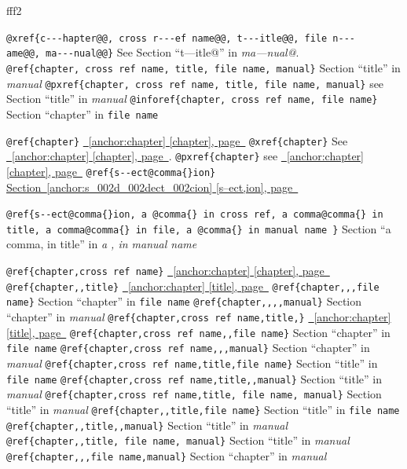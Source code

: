 \documentclass{book}
\newenvironment{Texinfoindented}{\begin{list}{}{}\item\relax}{\end{list}}
\renewcommand{\_}{\Texinfounderscore\discretionary{}{}{}}
\begin{document}
\begin{titlepage}
%
\begin{Texinfoindented}
\unskip{\parskip=0pt\noindent}%
fff2
\end{Texinfoindented}


\texttt{@xref\{c{-}{-}{-}hapter@@,\ cross r{-}{-}{-}ef name@@,\ t{-}{-}{-}itle@@,\ file n{-}{-}{-}ame@@,\ ma{-}{-}{-}nual@@\}} See Section ``t---itle@'' in \textsl{ma---nual@}.
\texttt{@ref\{chapter,\ cross ref name,\ title,\ file name,\ manual\}} Section ``title'' in \textsl{manual}
\texttt{@pxref\{chapter,\ cross ref name,\ title,\ file name,\ manual\}} see Section ``title'' in \textsl{manual}
\texttt{@inforef\{chapter,\ cross ref name,\ file name\}} Section ``chapter'' in \texttt{file name}

\texttt{@ref\{chapter\}} \hyperref[anchor:chapter]{\chaptername~\ref*{anchor:chapter} [chapter], page~\pageref*{anchor:chapter}}
\texttt{@xref\{chapter\}} See \hyperref[anchor:chapter]{\chaptername~\ref*{anchor:chapter} [chapter], page~\pageref*{anchor:chapter}}.
\texttt{@pxref\{chapter\}} see \hyperref[anchor:chapter]{\chaptername~\ref*{anchor:chapter} [chapter], page~\pageref*{anchor:chapter}}
\texttt{@ref\{s{-}{-}ect@comma\{\}ion\}} \hyperref[anchor:s_002d_002dect_002cion]{Section~\ref*{anchor:s_002d_002dect_002cion} [s--ect,ion], page~\pageref*{anchor:s_002d_002dect_002cion}}

\texttt{@ref\{s{-}{-}ect@comma\{\}ion,\ a @comma\{\}\ in cross
ref,\ a comma@comma\{\}\ in title,\ a comma@comma\{\}\ in file,\ a @comma\{\}\ in manual name \}}
Section ``a comma, in title'' in \textsl{a , in manual name}

\texttt{@ref\{chapter,cross ref name\}} \hyperref[anchor:chapter]{\chaptername~\ref*{anchor:chapter} [chapter], page~\pageref*{anchor:chapter}}
\texttt{@ref\{chapter{,}{,}title\}} \hyperref[anchor:chapter]{\chaptername~\ref*{anchor:chapter} [title], page~\pageref*{anchor:chapter}}
\texttt{@ref\{chapter{,}{,},file name\}} Section ``chapter'' in \texttt{file name}
\texttt{@ref\{chapter{,}{,}{,}{,}manual\}} Section ``chapter'' in \textsl{manual}
\texttt{@ref\{chapter,cross ref name,title,\}} \hyperref[anchor:chapter]{\chaptername~\ref*{anchor:chapter} [title], page~\pageref*{anchor:chapter}}
\texttt{@ref\{chapter,cross ref name{,}{,}file name\}} Section ``chapter'' in \texttt{file name}
\texttt{@ref\{chapter,cross ref name{,}{,},manual\}} Section ``chapter'' in \textsl{manual}
\texttt{@ref\{chapter,cross ref name,title,file name\}} Section ``title'' in \texttt{file name}
\texttt{@ref\{chapter,cross ref name,title{,}{,}manual\}} Section ``title'' in \textsl{manual}
\texttt{@ref\{chapter,cross ref name,title,\ file name,\ manual\}} Section ``title'' in \textsl{manual}
\texttt{@ref\{chapter{,}{,}title,file name\}} Section ``title'' in \texttt{file name}
\texttt{@ref\{chapter{,}{,}title{,}{,}manual\}} Section ``title'' in \textsl{manual}
\texttt{@ref\{chapter{,}{,}title,\ file name,\ manual\}} Section ``title'' in \textsl{manual}
\texttt{@ref\{chapter{,}{,},file name,manual\}} Section ``chapter'' in \textsl{manual}



\end{titlepage}
\end{document}
